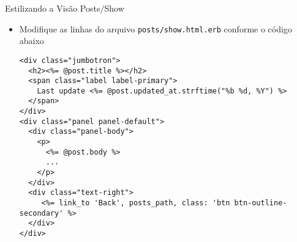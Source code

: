 \begin{frame}[fragile,t]{Estilizando a Visão Posts$/$Show}
    \begin{itemize}
      \item Modifique as linhas do arquivo \verb|posts/show.html.erb| conforme o código abaixo
      \begin{lstlisting}[style=RubyInputStyle, basicstyle=\tiny\ttfamily, caption=app/views/posts/show.html.erb]
<div class="jumbotron">
  <h2><%= @post.title %></h2>
  <span class="label label-primary"> 
    Last update <%= @post.updated_at.strftime("%b %d, %Y") %>
  </span>
</div>
<div class="panel panel-default">
  <div class="panel-body">
    <p>
      <%= @post.body %>
      ...
    </p>
  </div>
  <div class="text-right">
     <%= link_to 'Back', posts_path, class: 'btn btn-outline-secondary' %>
  </div>
</div>
    \end{lstlisting}
  \end{itemize}
\end{frame} 